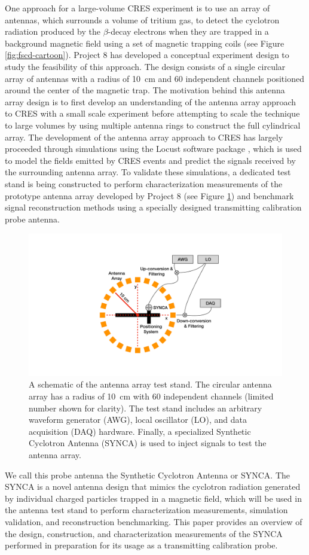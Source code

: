 One approach for a large-volume CRES experiment is to use an array of antennas, which surrounds a volume of tritium gas, to detect the cyclotron radiation produced by the $\beta$-decay electrons when they are trapped in a background magnetic field using a set of magnetic trapping coils (see Figure \ref{fig:fscd-cartoon}). Project 8 has developed a conceptual experiment design to study the feasibility of this approach. The design consists of a single circular array of antennas with a radius of 10~cm and 60 independent channels positioned around the center of the magnetic trap. The motivation behind this antenna array design is to first develop an understanding of the antenna array approach to CRES with a small scale experiment before attempting to scale the technique to large volumes by using multiple antenna rings to construct the full cylindrical array. The development of the antenna array approach to CRES has largely proceeded through simulations using the Locust software package \cite{Ashtari_Esfahani_2019, nb_thesis}, which is used to model the fields emitted by CRES events and predict the signals received by the surrounding antenna array. To validate these simulations, a dedicated test stand is being constructed to perform characterization measurements of the prototype antenna array developed by Project 8 (see Figure \ref{fig:testbed-cartoon}) and benchmark signal reconstruction methods using a specially designed transmitting calibration probe antenna.
\begin{figure}[htbp]
\centering
\includegraphics[width=.4\textwidth]{figs/Chapter-5/220726_synca_measurements.pdf}
\qquad
\caption{\label{fig:testbed-cartoon} A schematic of the antenna array test stand. The circular antenna array has a radius of 10~cm with 60 independent channels (limited number shown for clarity). The test stand includes an arbitrary waveform generator (AWG), local oscillator (LO), and data acquisition (DAQ) hardware. Finally, a specialized Synthetic Cyclotron Antenna (SYNCA) is used to inject signals to test the antenna array.}
\end{figure}

We call this probe antenna the Synthetic Cyclotron Antenna or SYNCA. The SYNCA is a novel antenna design that mimics the cyclotron radiation generated by individual charged particles trapped in a magnetic field, which will be used in the antenna test stand to perform characterization measurements, simulation validation, and reconstruction benchmarking. This paper provides an overview of the design, construction, and characterization measurements of the SYNCA performed in preparation for its usage as a transmitting calibration probe. 

